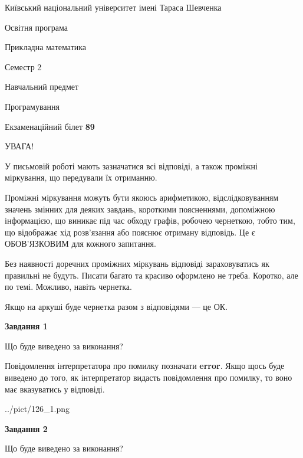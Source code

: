 \documentclass[12pt, ukrainian]{article}
\begin{document}
{{\begin {small}\par
{ \center  Київський національний університет імені Тараса Шевченка \par}
{\parbox {5 cm}{Освітня програма \hfill}{\parbox {7 cm}{Прикладна математика \hfill}}\parbox {6 cm}{\hfill Семестр 2}}\par
{\parbox {5 cm} {Навчальний предмет \hfill}\parbox {7 cm}{Програмування \hfill}\parbox {6cm}{\hfill}\par}\vspace{-7pt} \end{small}}{\center Екзаменаційний білет \No \textbf
{ 89 }\par}}
{
\begin {large}
УВАГА!

У письмовій роботі мають зазначатися всі відповіді, а також проміжні міркування, що передували їх отриманню.

Проміжні міркування можуть бути якоюсь арифметикою, відслідковуванням зна\-чень змінних для деяких завдань,
короткими поясненнями, допоміжною інформацією, що виникає під час обходу графів, робочею чернеткою,
тобто тим, що відображає хід розв’язання або пояснює отриману відповідь.
Це є ОБОВ’ЯЗКОВИМ для кожного запитання.

Без наявності доречних проміжних міркувань відповіді зараховуватись як правиль\-ні не будуть.
Писати багато та красиво оформлено не треба. Коротко, але по темі. Можли\-во, навіть чернетка.

Якщо на аркуші буде чернетка разом з відповідями --- це ОК.

\newpage

{\begin {center}\textbf{Завдання 1}\end {center}}\par
Що буде виведено за виконання?

Повідомлення інтерпретатора про помилку позначати \textbf{error}.
Якщо щось буде виведено до того, як інтерпретатор видасть повідомлення про помилку, 
то воно має вказуватись у відповіді. \par


\begin{center}
	{../pict/126_1.png}
\end{center}
\newpage

{\begin {center}\textbf{Завдання 2}\end {center}}\par
Що буде виведено за виконання?


\end{large}}
\end{document}

